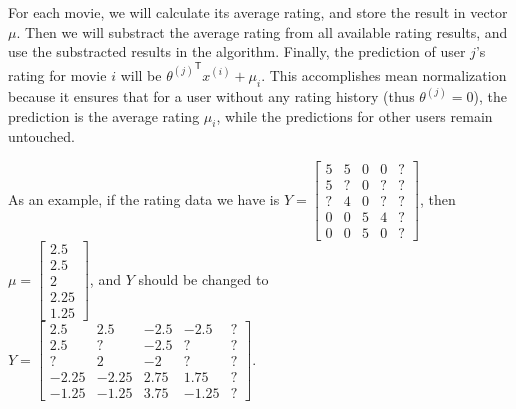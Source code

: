For each movie, we will calculate its average rating, and store the result in vector $\mu$. Then we will substract the average rating from all available rating results, and use the substracted results in the algorithm. Finally, the prediction of user $j$'s rating for movie $i$ will be ${\theta^{(j)}}^{\mathsf T}x^{(i)} + \mu_i$. This accomplishes mean normalization because it ensures that for a user without any rating history (thus $\theta^{(j)} = 0$), the prediction is the average rating $\mu_i$, while the predictions for other users remain untouched.

As an example, if the rating data we have is 
$Y=\begin{bmatrix}
5&5&0&0&?\\
5&?&0&?&?\\
?&4&0&?&?\\
0&0&5&4&?\\
0&0&5&0&?
\end{bmatrix}$, then $\mu = 
\begin{bmatrix}
2.5\\
2.5\\
2\\
2.25\\
1.25
\end{bmatrix}$, and $Y$ should be changed to
$Y=\begin{bmatrix}
2.5&2.5&-2.5&-2.5&?\\
2.5&?&-2.5&?&?\\
?&2&-2&?&?\\
-2.25&-2.25&2.75&1.75&?\\
-1.25&-1.25&3.75&-1.25&?
\end{bmatrix}.$

\ifx\PREAMBLE\undefined

\fi